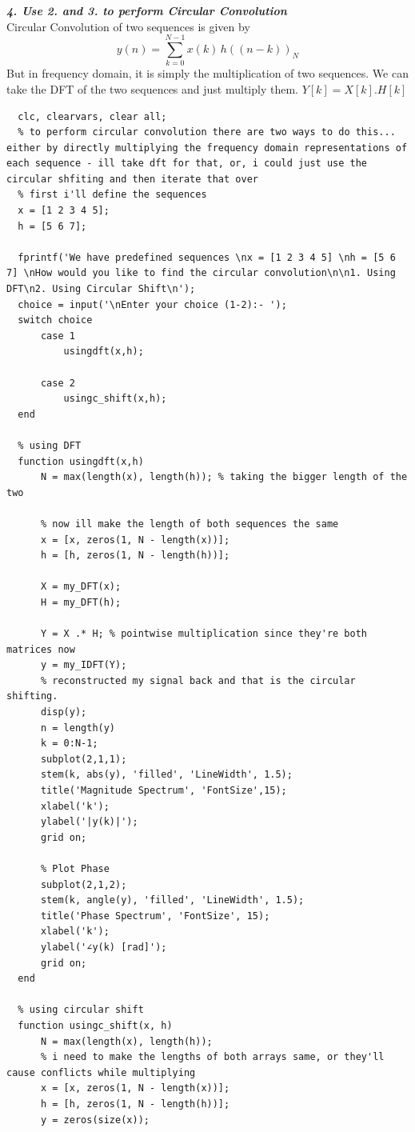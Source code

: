 \documentclass[12pt]{report}
\begin{document}
  \vspace{0.2cm}
  \textbf{\textit{4. Use 2. and 3. to perform Circular Convolution}} \\

  Circular Convolution of two sequences is given by \[ y(n) = \sum_{k=0}^{N-1} x(k) \, h((n - k))_{N}  \] But in frequency domain, it is simply the multiplication of two sequences. We can take the DFT of the two sequences and just multiply them. $ Y[k] = X[k] . H[k] $
  \begin{lstlisting}
  clc, clearvars, clear all;
  % to perform circular convolution there are two ways to do this... either by directly multiplying the frequency domain representations of each sequence - ill take dft for that, or, i could just use the circular shfiting and then iterate that over 
  % first i'll define the sequences
  x = [1 2 3 4 5];
  h = [5 6 7];

  fprintf('We have predefined sequences \nx = [1 2 3 4 5] \nh = [5 6 7] \nHow would you like to find the circular convolution\n\n1. Using DFT\n2. Using Circular Shift\n');
  choice = input('\nEnter your choice (1-2):- ');
  switch choice
      case 1
          usingdft(x,h);

      case 2
          usingc_shift(x,h);
  end

  % using DFT
  function usingdft(x,h)
      N = max(length(x), length(h)); % taking the bigger length of the two
      
      % now ill make the length of both sequences the same
      x = [x, zeros(1, N - length(x))];
      h = [h, zeros(1, N - length(h))];
      
      X = my_DFT(x);
      H = my_DFT(h);
      
      Y = X .* H; % pointwise multiplication since they're both matrices now
      y = my_IDFT(Y);
      % reconstructed my signal back and that is the circular shifting.
      disp(y);
      n = length(y)
      k = 0:N-1;
      subplot(2,1,1);
      stem(k, abs(y), 'filled', 'LineWidth', 1.5);
      title('Magnitude Spectrum', 'FontSize',15);
      xlabel('k');
      ylabel('|y(k)|');
      grid on;
      
      % Plot Phase
      subplot(2,1,2);
      stem(k, angle(y), 'filled', 'LineWidth', 1.5);
      title('Phase Spectrum', 'FontSize', 15);
      xlabel('k');
      ylabel('∠y(k) [rad]');
      grid on;
  end

  % using circular shift 
  function usingc_shift(x, h)
      N = max(length(x), length(h));
      % i need to make the lengths of both arrays same, or they'll cause conflicts while multiplying
      x = [x, zeros(1, N - length(x))];
      h = [h, zeros(1, N - length(h))];
      y = zeros(size(x));
      

\end{lstlisting}
\end{document}
